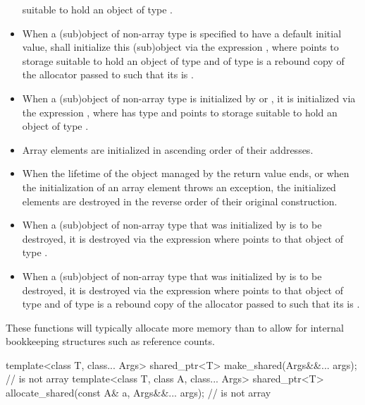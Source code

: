 \begin{itemdescr}
\begin{itemize}
  suitable to hold an object of type .
\item
  When a (sub)object of non-array type  is specified to have
  a default initial value,
   shall initialize this (sub)object
  via the expression ,
  where  points to storage
  suitable to hold an object of type  and
   of type  is a rebound copy of
  the allocator  passed to 
  such that its  is .
\item
  When a (sub)object of non-array type  is initialized by
   or\linebreak %
  ,
  it is initialized via the expression ,
  where  has type  and
  points to storage suitable to hold an object of type .
\item
  Array elements are initialized in ascending order of their addresses.
\item
  When the lifetime of the object managed by the return value ends, or
  when the initialization of an array element throws an exception,
  the initialized elements are destroyed in the reverse order
  of their original construction.
\item
  When a (sub)object of non-array type 
  that was initialized by  is to be destroyed,
  it is destroyed via the expression  where
   points to that object of type .
\item
  When a (sub)object of non-array type 
  that was initialized by  is to be destroyed,
  it is destroyed via the expression
   where
   points to that object of type  and
   of type  is a rebound copy of
  the allocator  passed to 
  such that its  is .
\end{itemize}
\begin{note}
These functions will typically allocate more memory than  to
allow for internal bookkeeping structures such as reference counts.
\end{note}
\end{itemdescr}

%
%
\begin{itemdecl}
template<class T, class... Args>
  shared_ptr<T> make_shared(Args&&... args);                    //  is not array
template<class T, class A, class... Args>
  shared_ptr<T> allocate_shared(const A& a, Args&&... args);    //  is not array
\end{itemdecl}

